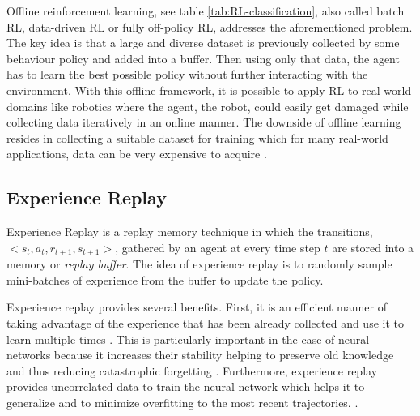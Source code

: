 Offline reinforcement learning, see table \ref{tab:RL-classification}, also called batch RL, data-driven RL or fully off-policy RL,  addresses the aforementioned problem. The key idea is that a large and diverse dataset is previously collected by some behaviour policy and added into a buffer. Then using only that data, the agent has to learn the best possible policy without further interacting with the environment. With this offline framework, it is possible to apply RL to real-world domains like robotics where the agent, the robot, could easily get damaged while collecting data iteratively in an online manner. The downside of offline learning resides in collecting a suitable dataset for training which for many real-world applications, data can be very expensive to acquire \cite{collecting_data_for_offline_learning}.







\subsection{Experience Replay}
\label{sec:experience-replay}

Experience Replay is a replay memory technique in which the transitions, $<s_t, a_t, r_{t+1}, s_{t+1}>$, gathered by an agent at every time step $t$ are stored into a memory or \textit{replay buffer}. The idea of experience replay is to randomly sample mini-batches of experience from the buffer to update the policy. 




Experience replay provides several benefits. First, it is an efficient manner of taking advantage of the experience that has been already collected and use it to learn multiple times \cite{Experience-Replay-zhang:2018}. This is particularly important in the case of neural networks because it increases their stability helping to preserve old knowledge and thus reducing catastrophic forgetting \cite{Experience_replay_stability:2019}.
Furthermore, experience replay provides uncorrelated data to train the neural network which helps it to generalize and to minimize overfitting to the most recent trajectories. \cite{Machine_learning_finance:2019}.

